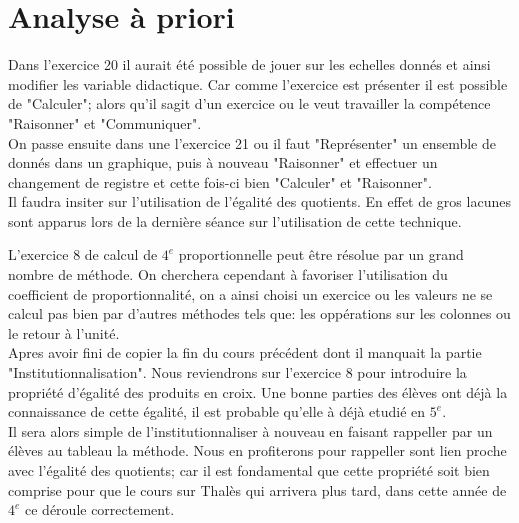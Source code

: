 {    
}
\section*{Analyse à priori}

Dans l'exercice 20 il aurait été possible de jouer sur les echelles donnés et ainsi modifier les variable didactique.
Car comme l'exercice est présenter il est possible de "Calculer";
alors qu'il sagit d'un exercice ou le veut travailler la compétence "Raisonner" et "Communiquer".\\

On passe ensuite dans une l'exercice 21 ou il faut "Représenter" un ensemble de donnés dans un graphique,
puis à nouveau "Raisonner" et effectuer un changement de registre et cette fois-ci bien "Calculer" et "Raisonner".\\
Il faudra insiter sur l'utilisation de l'égalité des quotients.
En effet de gros lacunes sont apparus lors de la dernière séance sur l'utilisation de cette technique.

L'exercice 8 de calcul de $4^e$ proportionnelle peut être résolue par un grand nombre de méthode.
On cherchera cependant à favoriser l'utilisation du coefficient de proportionnalité,
on a ainsi choisi un exercice ou les valeurs ne se calcul pas bien par d'autres méthodes tels que:
les oppérations sur les colonnes ou le retour à l'unité.\\

Apres avoir fini de copier la fin du cours précédent dont il manquait la partie "Institutionnalisation".
Nous reviendrons sur l'exercice 8 pour introduire la propriété d'égalité des produits en croix.
Une bonne parties des élèves ont déjà la connaissance de cette égalité,
il est probable qu'elle à déjà etudié en $5^e$.\\
Il sera alors simple de l'institutionnaliser à nouveau en faisant rappeller par un élèves au tableau la méthode.
Nous en profiterons pour rappeller sont lien proche avec l'égalité des quotients;
car il est fondamental que cette propriété soit bien comprise pour que le cours sur Thalès qui arrivera plus tard,
dans cette année de $4^e$ ce déroule correctement.

